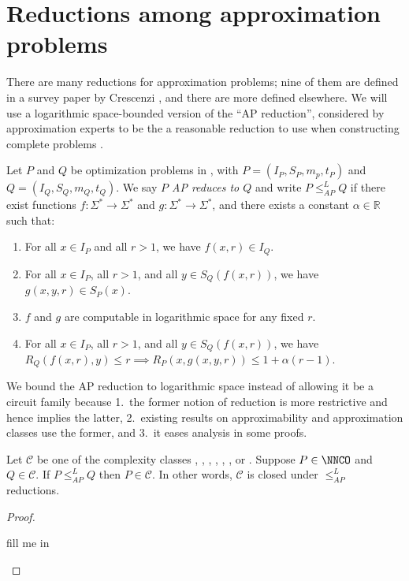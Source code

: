 \documentclass[]{article}
\newcommand{\APr}{\leq_{AP}^{L}}
\begin{document}
\section{Reductions among approximation problems}

There are many reductions for approximation problems; nine of them are defined in a survey paper by Crescenzi \cite{crescenzi97}, and there are more defined elsewhere.
We will use a logarithmic space-bounded version of the ``AP reduction'', considered by approximation experts to be the a reasonable reduction to use when constructing complete problems \cite[Section~2]{crescenzi97} \cite[Section~8.6]{acgkmp99}.

\begin{definition}{\cite[Definition~9]{ckst95}}
  Let $P$ and $Q$ be optimization problems in \NNCO, with $P=(I_P, S_P, m_p, t_P)$ and $Q=(I_Q, S_Q, m_Q, t_Q)$.
  We say \emph{$P$ AP reduces to $Q$} and write $P\APr Q$ if there exist functions $f\colon\Sigma^*\to\Sigma^*$ and $g\colon\Sigma^*\to\Sigma^*$, and there exists a constant $\alpha\in\mathbb{R}$ such that:
  \begin{enumerate}
  \item For all $x\in I_P$ and all $r > 1$, we have $f(x, r)\in I_Q$.
  \item For all $x\in I_P$, all $r > 1$, and all $y\in S_Q(f(x, r))$, we have $g(x, y, r)\in S_P(x)$.
  \item $f$ and $g$ are computable in logarithmic space for any fixed $r$.
  \item For all $x\in I_P$, all $r > 1$, and all $y\in S_Q(f(x, r))$, we have $R_Q(f(x, r), y) \leq r \implies R_P(x, g(x, y, r)) \leq 1 + \alpha(r - 1)$.
  \end{enumerate}
\end{definition}

We bound the AP reduction to logarithmic space instead of allowing it be a \FNC{} circuit family because 1.~the former notion of reduction is more restrictive and hence implies the latter, 2.~existing results on approximability and approximation classes use the former, and 3.~it eases analysis in some proofs.

\begin{proposition}
  Let $\mathcal{C}$ be one of the complexity classes \NCO, \NCAS, \ApxNCO, \logApxNCO, \polyApxNCO, \expApxNCO, or \NNCO.
  Suppose $P\in\NNCO$ and $Q\in\mathcal{C}$.
  If $P\APr Q$ then $P\in \mathcal{C}$.
  In other words, $\mathcal{C}$ is closed under $\APr$ reductions.
\end{proposition}
\begin{proof}
  \begin{todo}
    fill me in
  \end{todo}
\end{proof}
\end{document}

